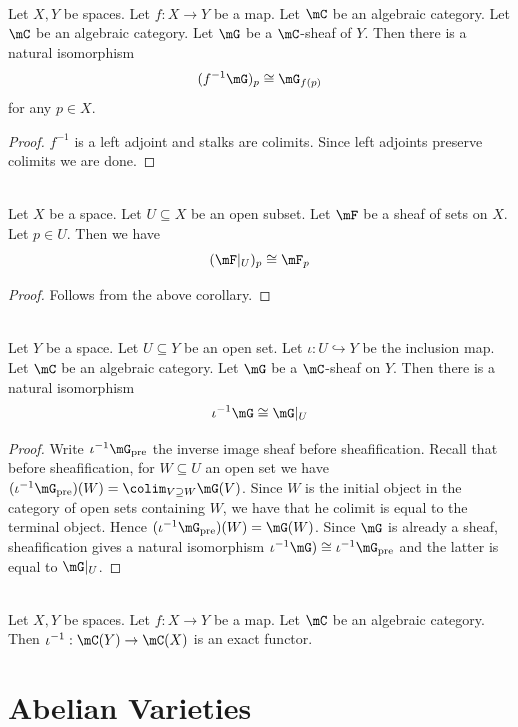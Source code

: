 \documentclass[a4paper]{article}
\begin{document}
\begin{crl}{}{}\\
Let $X,Y$ be spaces. Let $f:X\to Y$ be a map. Let $\mC$ be an algebraic category. Let $\mC$ be an algebraic category. Let $\mG$ be a $\mC$-sheaf of $Y$. Then there is a natural isomorphism $$(f^{-1}\mG)_p\cong\mG_{f(p)}$$ for any $p\in X$. 
\begin{proof}
$f^{-1}$ is a left adjoint and stalks are colimits. Since left adjoints preserve colimits we are done. 
\end{proof}
\end{crl}

\begin{eg}{}{}\\
Let $X$ be a space. Let $U\subseteq X$ be an open subset. Let $\mF$ be a sheaf of sets on $X$. Let $p\in U$. Then we have $$(\mF|_U)_p\cong\mF_p$$
\begin{proof}
Follows from the above corollary. 
\end{proof}
\end{eg}

\begin{lmm}{}{}\\
Let $Y$ be a space. Let $U\subseteq Y$ be an open set. Let $\iota:U\hookrightarrow Y$ be the inclusion map. Let $\mC$ be an algebraic category. Let $\mG$ be a $\mC$-sheaf on $Y$. Then there is a natural isomorphism $$\iota^{-1}\mG\cong\mG|_U$$
\begin{proof}
Write $\iota^{-1}\mG_\text{pre}$ the inverse image sheaf before sheafification. Recall that before sheafification, for $W\subseteq U$ an open set we have $(\iota^{-1}\mG_\text{pre})(W)=\colim_{V\supseteq W}\mG(V)$. Since $W$ is the initial object in the category of open sets containing $W$, we have that he colimit is equal to the terminal object. Hence $(\iota^{-1}\mG_\text{pre})(W)=\mG(W)$. Since $\mG$ is already a sheaf, sheafification gives a natural isomorphism $\iota^{-1}\mG)\cong\iota^{-1}\mG_\text{pre}$ and the latter is equal to $\mG|_U$. 
\end{proof}
\end{lmm}

\begin{prp}{}{}\\
Let $X,Y$ be spaces. Let $f:X\to Y$ be a map. Let $\mC$ be an algebraic category. Then $\iota^{-1}:\mC(Y)\to\mC(X)$ is an exact functor. 
\end{prp}

\pagebreak
\part{Abelian Varieties}
\pagebreak
\end{document}
